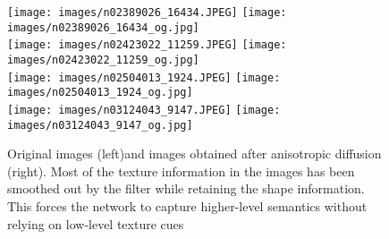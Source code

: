 \documentclass{bmvc2k}
\begin{document}
    
\begin{figure*}\centering
\centering
        \texttt{[image: images/n02389026\_16434.JPEG]}
\centering
        \texttt{[image: images/n02389026\_16434\_og.jpg]}
\\
\centering
        \texttt{[image: images/n02423022\_11259.JPEG]}
\centering
        \texttt{[image: images/n02423022\_11259\_og.jpg]}
\\
\centering
        \texttt{[image: images/n02504013\_1924.JPEG]}
\centering
        \texttt{[image: images/n02504013\_1924\_og.jpg]}
\\
\centering
        \texttt{[image: images/n03124043\_9147.JPEG]}
\centering
        \texttt{[image: images/n03124043\_9147\_og.jpg]}
\\
\caption{Original images (left)and images obtained after anisotropic diffusion (right). Most of the texture information in the images has been smoothed out by the filter while retaining the shape information. This forces the network to capture higher-level semantics without relying on low-level texture cues}
\label{fig:example2}\end{figure*}

\noindent
\end{document}
